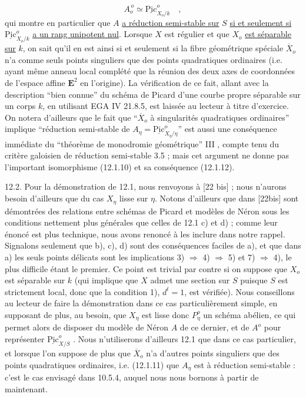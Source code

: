 \begin{equation}\tag{12.1.12}
A_o^{\,o} \simeq \underline{\mathrm{Pic}}^o_{X_o/k} \quad ,
\end{equation}
qui montre en particulier que $A$ \underline{a réduction semi-stable sur} $S$ \underline{si et seulement si} $\underline{\mathrm{Pic}}^o_{X_o/k}$ \underline{a un rang unipotent nul}. Lorsque $X$ est régulier et que $X_o$ \underline{est séparable sur} $k$, on sait qu'il en est ainsi si et seulement si la fibre géométrique spéciale $\overline{X}_o$ n'a comme seuls points singuliers que des points quadratiques ordinaires (i.e. ayant même anneau local complété que la réunion des deux axes de coordonnées de l'espace affine $\mathbf{E}^2$ en l'origine). La vérification de ce fait, allant avec la description ``bien connue'' du schéma de Picard d'une courbe propre séparable sur un corps $k$, en utilisant EGA IV 21.8.5, est laissée au lecteur à titre d'exercice. On notera d'ailleurs que le fait que ``$\overline{X}_o$ à singularités quadratiques ordinaires'' implique ``réduction semi-stable de $A_\eta = \underline{\mathrm{Pic}}^o_{X_\eta/\eta}$'' est aussi une conséquence immédiate du ``théorème de monodromie géométrique'' III \hspace{3.5em} , compte tenu du critère galoisien de réduction semi-stable 3.5 ; mais cet argument ne donne pas l'important isomorphisme (12.1.10) et sa conséquence (12.1.12).



12.2. Pour la démonstration de 12.1, nous renvoyons à [22 bis] ; nous n'aurons besoin d'ailleurs que du cas $X_\eta$ lisse sur $\eta$. Notons d'ailleurs que dans [22bis] sont démontrées des relations entre schémas de Picard et modèles de Néron sous les conditions nettement plus générales que celles de 12.1 c) et d) ; comme leur énoncé est plus technique, nous avons renoncé à les inclure dans notre rappel. Signalons seulement que b), c), d) sont des conséquences faciles de a), et que dans a) les seuls points délicats sont les implications 3) $\Longrightarrow$ 4) $\Longrightarrow$ 5) et 7) $\Longrightarrow$ 4), le plus difficile étant le premier. Ce point est trivial par contre si on suppose que $X_o$ est séparable sur $k$ (qui implique que $X$ admet une section sur $S$ puisque $S$ est strictement local, donc que la condition 1), $d^t=1$, est vérifiée). Nous conseillons au lecteur de faire la démonstration dans ce cas particulièrement simple, en supposant de plus, au besoin, que $X_\eta$ est lisse donc $P^o_\eta$ un schéma abélien, ce qui permet alors de disposer du modèle de Néron $A$ de ce dernier, et de $A^o$ pour représenter $\underline{\mathrm{Pic}}^o_{X/S}$ . Nous n'utiliserons d'ailleurs 12.1 que dans ce cas particulier, et lorsque l'on suppose de plus que $\overline{X}_o$ n'a d'autres points singuliers que des points quadratiques ordinaires, i.e. (12.1.11) que $A_\eta$ est à réduction semi-stable : c'est le cas envisagé dans 10.5.4, auquel nous nous bornons à partir de maintenant.

